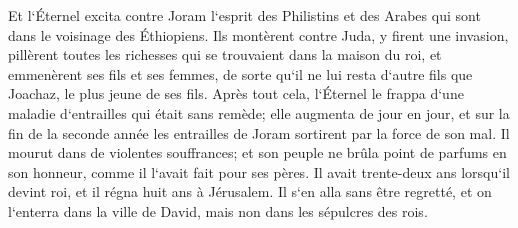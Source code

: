 \verse Et l`Éternel excita contre Joram l`esprit des Philistins et des Arabes qui sont dans le voisinage des Éthiopiens. 
\verse Ils montèrent contre Juda, y firent une invasion, pillèrent toutes les richesses qui se trouvaient dans la maison du roi, et emmenèrent ses fils et ses femmes, de sorte qu`il ne lui resta d`autre fils que Joachaz, le plus jeune de ses fils. 
\verse Après tout cela, l`Éternel le frappa d`une maladie d`entrailles qui était sans remède; 
\verse elle augmenta de jour en jour, et sur la fin de la seconde année les entrailles de Joram sortirent par la force de son mal. Il mourut dans de violentes souffrances; et son peuple ne brûla point de parfums en son honneur, comme il l`avait fait pour ses pères. 
\verse Il avait trente-deux ans lorsqu`il devint roi, et il régna huit ans à Jérusalem. Il s`en alla sans être regretté, et on l`enterra dans la ville de David, mais non dans les sépulcres des rois. 

